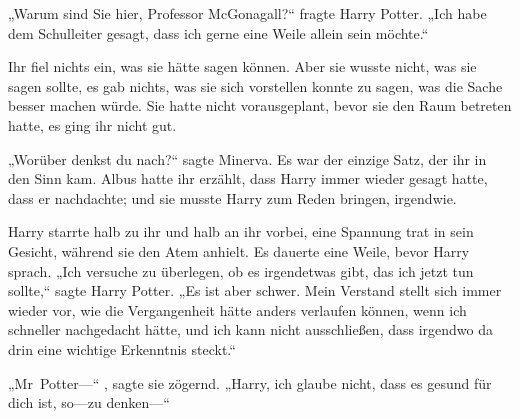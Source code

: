 „Warum sind Sie hier, Professor McGonagall?“ fragte Harry Potter. „Ich habe dem Schulleiter gesagt, dass ich gerne eine Weile allein sein möchte.“

Ihr fiel nichts ein, was sie hätte sagen können. Aber sie wusste nicht, was sie sagen sollte, es gab nichts, was sie sich vorstellen konnte zu sagen, was die Sache besser machen würde. Sie hatte nicht vorausgeplant, bevor sie den Raum betreten hatte, es ging ihr nicht gut.

„Worüber denkst du nach?“ sagte Minerva.
Es war der einzige Satz, der ihr in den Sinn kam. Albus hatte ihr erzählt, dass Harry immer wieder gesagt hatte, dass er nachdachte; und sie musste Harry zum Reden bringen, irgendwie.



Harry starrte halb zu ihr und halb an ihr vorbei, eine Spannung trat in sein Gesicht, während sie den Atem anhielt. Es dauerte eine Weile, bevor Harry sprach. „Ich versuche zu überlegen, ob es irgendetwas gibt, das ich jetzt tun sollte,“ sagte Harry Potter. „Es ist aber schwer. Mein Verstand stellt sich immer wieder vor, wie die Vergangenheit hätte anders verlaufen können, wenn ich schneller nachgedacht hätte, und ich kann nicht ausschließen, dass irgendwo da drin eine wichtige Erkenntnis steckt.“

„Mr~Potter—“ , sagte sie zögernd. „Harry, ich glaube nicht, dass es gesund für dich ist, so—zu denken—“

